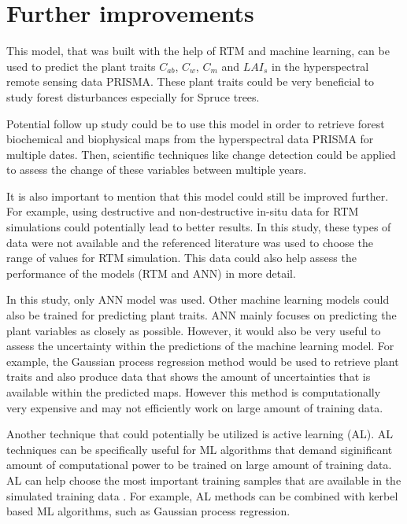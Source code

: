 \documentclass[a4paper, twoside]{templates/ociamthesis}
\begin{document}
\hypertarget{further-improvements}{%
\section{Further improvements}\label{further-improvements}}

This model, that was built with the help of RTM and machine learning, can be used to predict the plant traits \(C_{ab}\), \(C_{w}\), \(C_{m}\) and \(LAI_{s}\) in the hyperspectral remote sensing data PRISMA. These plant traits could be very beneficial to study forest disturbances especially for Spruce trees.

Potential follow up study could be to use this model in order to retrieve forest biochemical and biophysical maps from the hyperspectral data PRISMA for multiple dates. Then, scientific techniques like change detection could be applied to assess the change of these variables between multiple years.

It is also important to mention that this model could still be improved further. For example, using destructive and non-destructive in-situ data for RTM simulations could potentially lead to better results. In this study, these types of data were not available and the referenced literature was used to choose the range of values for RTM simulation. This data could also help assess the performance of the models (RTM and ANN) in more detail.

In this study, only ANN model was used. Other machine learning models could also be trained for predicting plant traits. ANN mainly focuses on predicting the plant variables as closely as possible. However, it would also be very useful to assess the uncertainty within the predictions of the machine learning model. For example, the Gaussian process regression method would be used to retrieve plant traits and also produce data that shows the amount of uncertainties that is available within the predicted maps. However this method is computationally very expensive and may not efficiently work on large amount of training data.

Another technique that could potentially be utilized is active learning (AL). AL techniques can be specifically useful for ML algorithms that demand siginificant amount of computational power to be trained on large amount of training data. AL can help choose the most important training samples that are available in the simulated training data \citep{verrelst2016active}. For example, AL methods can be combined with kerbel based ML algorithms, such as Gaussian process regression.
\end{document}
